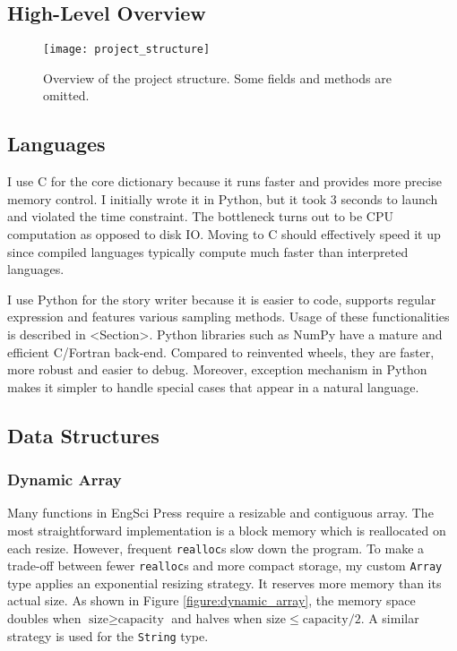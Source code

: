 \documentclass[../main.tex]{subfiles}
\begin{document}
\subsection{High-Level Overview}

\begin{figure}
	\centering
	\texttt{[image: project\_structure]}
	\caption{Overview of the project structure. Some fields and methods are omitted.}
	\label{figure:project_structure}
\end{figure}

\subsection{Languages}

I use C for the core dictionary because it runs faster and provides more precise memory control. I initially wrote it in Python, but it took 3 seconds to launch and violated the time constraint. The bottleneck turns out to be CPU computation as opposed to disk IO. Moving to C should effectively speed it up since compiled languages typically compute much faster than interpreted languages.

I use Python for the story writer because it is easier to code, supports regular expression and features various sampling methods. Usage of these functionalities is described in <Section>. Python libraries such as NumPy have a mature and efficient C/Fortran back-end. Compared to reinvented wheels, they are faster, more robust and easier to debug. Moreover, exception mechanism in Python makes it simpler to handle special cases that appear in a natural language.

\subsection{Data Structures}

\subsubsection{Dynamic Array}

Many functions in EngSci Press require a resizable and contiguous array. The most straightforward implementation is a block memory which is reallocated on each resize. However, frequent \texttt{realloc}s slow down the program. To make a trade-off between fewer \texttt{realloc}s and more compact storage, my custom \texttt{Array} type applies an exponential resizing strategy. It reserves more memory than its actual size. As shown in Figure \ref{figure:dynamic_array}, the memory space doubles when $\textrm{size} \geq \textrm{capacity}$ and halves when $\textrm{size} \leq \textrm{capacity} / 2$. A similar strategy is used for the \texttt{String} type.
\end{document}
